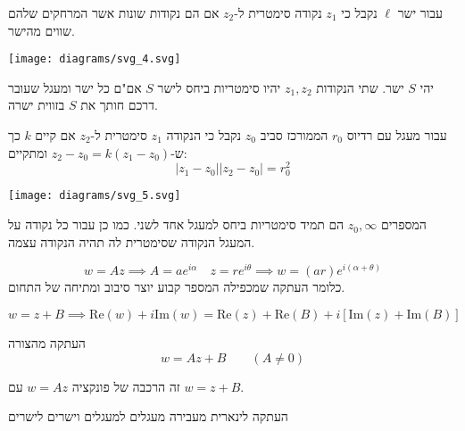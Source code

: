\documentclass{tstextbook}
\begin{document}
\begin{definition}
עבור ישר \(\ell\) נקבל כי \(z_{1}\) נקודה סימטרית ל-\(z_{2}\) אם הם נקודות שונות אשר המרחקים שלהם שווים מהישר.

\end{definition}
\texttt{[image: diagrams/svg\_4.svg]}
\begin{proposition}
יהי \(S\) ישר. שתי הנקודות \(z_{1},z_{2}\) יהיו סימטריות ביחס לישר \(S\) אם"ם כל ישר ומעגל שעובר דרכם חותך את \(S\) בזווית ישרה. 

\end{proposition}
\begin{definition}
עבור מעגל עם רדיוס \(r_{0}\) הממורכז סביב \(z_{0}\) נקבל כי הנקודה \(z_{1}\) סימטרית ל-\(z_{2}\) אם קיים \(k\) כך ש-\(z_{2}-z_{0}=k(z_{1}-z_{0})\) ומתקיים:
$$|z_{1}-z_{0}||z_{2}-z_{0}|=r_{0}^2$$

\end{definition}
\texttt{[image: diagrams/svg\_5.svg]}
\begin{remark}
המספרים \(z_{0},\infty\) הם תמיד סימטריות ביחס למעגל אחד לשני. כמו כן עבור כל נקודה על המעגל הנקודה שסימטרית לה תהיה הנקודה עצמה.

\end{remark}
\begin{proposition}
$$w=Az\implies A=a e^{i\alpha}\quad  z=r e^{i\theta}\implies w=(a r)e^{i\left( \alpha+\theta \right)}$$
כלומר העתקה שמכפילה המספר קבוע יוצר סיבוב ומתיחה של התחום.

\end{proposition}
\begin{proposition}
$$w=z+B\implies \mathrm{Re}(w)+i\mathrm{Im}(w)=\mathrm{Re}(z)+\mathrm{Re}(B)+i\left[ \mathrm{Im}(z)+\mathrm{Im}(B) \right]$$

\end{proposition}
\begin{definition}
העתקה מהצורה
$$w=A z+B\qquad(A\neq0)$$

\end{definition}
\begin{remark}
זה הרכבה של פונקציה \(w=Az\) עם \(w=z+B\).

\end{remark}
\begin{proposition}
העתקה לינארית מעבירה מעגלים למעגלים וישרים לישרים

\end{proposition}
\end{document}
